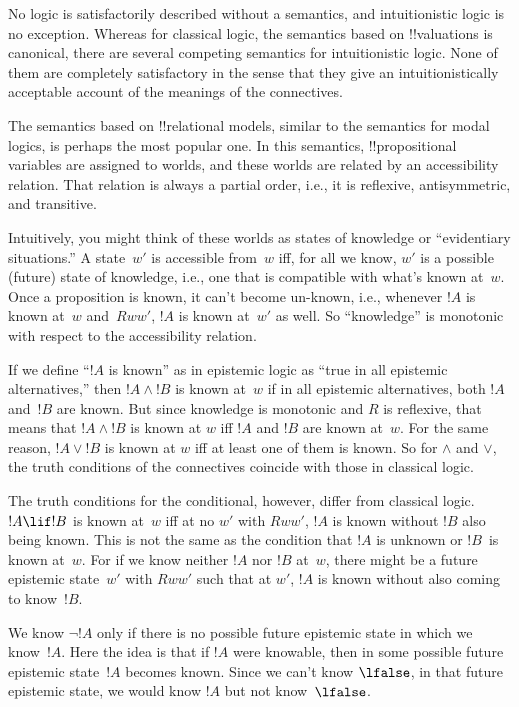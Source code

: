 \documentclass[../../../include/open-logic-section]{subfiles}
\begin{document}

No logic is satisfactorily described without a semantics, and
intuitionistic logic is no exception. Whereas for classical logic, the
semantics based on !!{valuation}s is canonical, there are several
competing semantics for intuitionistic logic. None of them are
completely satisfactory in the sense that they give an
intuitionistically acceptable account of the meanings of the
connectives.

The semantics based on !!{relational model}s, similar to the semantics
for modal logics, is perhaps the most popular one.  In this semantics,
!!{propositional variable}s are assigned to worlds, and these worlds
are related by an accessibility relation. That relation is always a
partial order, i.e., it is reflexive, antisymmetric, and
transitive.

Intuitively, you might think of these worlds as states of knowledge or
``evidentiary situations.''  A state~$w'$ is accessible from~$w$ iff,
for all we know, $w'$ is a possible (future) state of knowledge, i.e.,
one that is compatible with what's known at~$w$.  Once a proposition
is known, it can't become un-known, i.e., whenever $!A$ is known at~$w$
and~$Rww'$, $!A$ is known at~$w'$ as well. So ``knowledge'' is
monotonic with respect to the accessibility relation.

If we define ``$!A$ is known'' as in epistemic logic as ``true in all
epistemic alternatives,'' then $!A \land !B$ is known at~$w$ if in all
epistemic alternatives, both $!A$ and~$!B$ are known. But since
knowledge is monotonic and $R$ is reflexive, that means that $!A \land
!B$ is known at $w$ iff $!A$ and $!B$ are known at~$w$.  For the same
reason, $!A \lor !B$ is known at $w$ iff at least one of them is
known. So for $\land$ and $\lor$, the truth conditions of the
connectives coincide with those in classical logic.

The truth conditions for the conditional, however, differ from
classical logic. $!A \lif !B$ is known at~$w$ iff at no $w'$ with
$Rww'$, $!A$ is known without $!B$ also being known. This is not the
same as the condition that $!A$ is unknown or $!B$~is known
at~$w$. For if we know neither $!A$ nor $!B$ at~$w$, there might be a
future epistemic state~$w'$ with $Rww'$ such that at $w'$, $!A$ is
known without also coming to know~$!B$.

We know $\lnot !A$ only if there is no possible future epistemic state
in which we know~$!A$. Here the idea is that if $!A$ were knowable,
then in some possible future epistemic state~$!A$ becomes known. Since
we can't know $\lfalse$, in that future epistemic state, we would know
$!A$ but not know~$\lfalse$.
\end{document}
